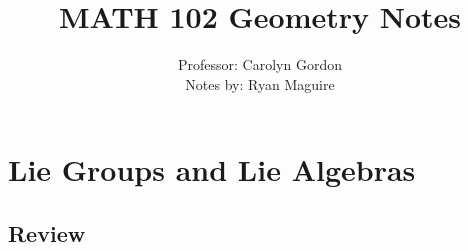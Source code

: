 \documentclass{book}                                                           %
\begin{document}
    \title{MATH 102 Geometry Notes}
    \author{%
        Professor: Carolyn Gordon\\
        Notes by: Ryan Maguire%
    }
    \date{\vspace{-5ex}}
    \maketitle
    \tableofcontents
    \listoffigures
    \chapter{Lie Groups and Lie Algebras}
        \section{Review}
\end{document}

